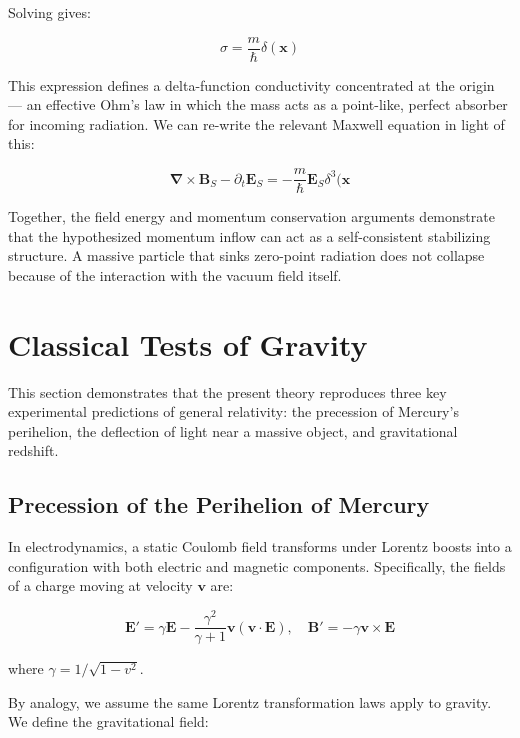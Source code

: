 \documentclass {article}
\renewcommand\vec{\mathbf}
\let\OldS\nabla
\renewcommand{\nabla}{\boldsymbol{\OldS}}
\begin{document}
Solving gives:

\begin{equation}
\sigma = \frac{m}{\hbar} \delta(\vec{x})
\end{equation}

This expression defines a delta-function conductivity concentrated at the origin — an effective Ohm's law in which the mass acts as a point-like, perfect absorber for incoming radiation.  We can re-write the relevant Maxwell equation in light of this:

\begin{equation}
\nabla \times \vec{B}_S - \partial_t \vec{E}_S = -\frac{m}{\hbar} \vec{E}_S \delta^3(\vec{x}
\label{eq:ohm}
\end{equation}



Together, the field energy and momentum conservation arguments demonstrate that the hypothesized momentum inflow can act as a self-consistent stabilizing structure. A massive particle that sinks zero-point radiation does not collapse because of the interaction with the vacuum field itself.

	
\section{Classical Tests of Gravity}

This section demonstrates that the present theory reproduces three key experimental predictions of general relativity: the precession of Mercury's perihelion, the deflection of light near a massive object, and gravitational redshift. 

\subsection{Precession of the Perihelion of Mercury}

In electrodynamics, a static Coulomb field transforms under Lorentz boosts into a configuration with both electric and magnetic components. Specifically, the fields of a charge moving at velocity \( \vec{v} \) are:

\begin{equation}
\vec{E}' = \gamma \vec{E} - \frac{\gamma^2}{\gamma + 1} \vec{v} (\vec{v} \cdot \vec{E}), \quad
\vec{B}' = - \gamma \vec{v} \times \vec{E}
\end{equation}

where \( \gamma = 1 / \sqrt{1 - v^2} \).

By analogy, we assume the same Lorentz transformation laws apply to gravity. We define the gravitational field:
\end{document}
